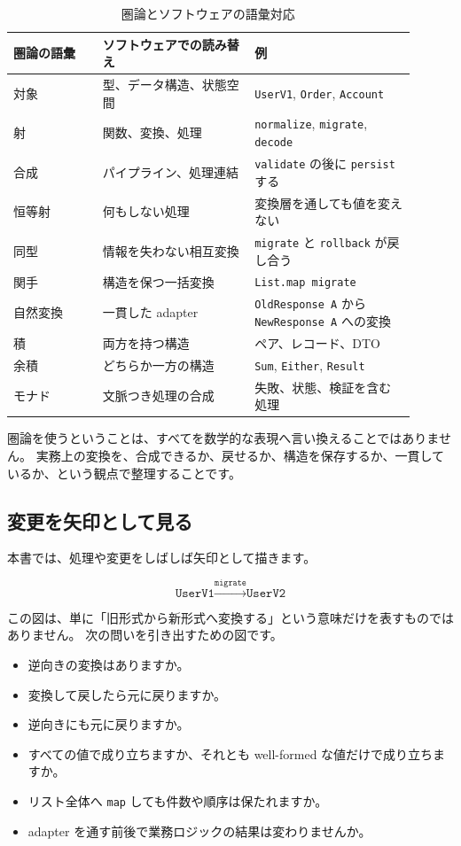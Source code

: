 \begin{table}[htbp]
\centering
\caption{圏論とソフトウェアの語彙対応}
\label{tab:ch00-category-translation}
\begin{tabular}{p{0.20\linewidth}p{0.34\linewidth}p{0.36\linewidth}}
\toprule
圏論の語彙 & ソフトウェアでの読み替え & 例 \\
\midrule
対象 & 型、データ構造、状態空間 & \texttt{UserV1}, \texttt{Order}, \texttt{Account} \\
射 & 関数、変換、処理 & \texttt{normalize}, \texttt{migrate}, \texttt{decode} \\
合成 & パイプライン、処理連結 & \texttt{validate} の後に \texttt{persist} する \\
恒等射 & 何もしない処理 & 変換層を通しても値を変えない \\
同型 & 情報を失わない相互変換 & \texttt{migrate} と \texttt{rollback} が戻し合う \\
関手 & 構造を保つ一括変換 & \texttt{List.map migrate} \\
自然変換 & 一貫した adapter & \texttt{OldResponse A} から \texttt{NewResponse A} への変換 \\
積 & 両方を持つ構造 & ペア、レコード、DTO \\
余積 & どちらか一方の構造 & \texttt{Sum}, \texttt{Either}, \texttt{Result} \\
モナド & 文脈つき処理の合成 & 失敗、状態、検証を含む処理 \\
\bottomrule
\end{tabular}
\end{table}

圏論を使うということは、すべてを数学的な表現へ言い換えることではありません。
実務上の変換を、合成できるか、戻せるか、構造を保存するか、一貫しているか、という観点で整理することです。

\subsection{変更を矢印として見る}

本書では、処理や変更をしばしば矢印として描きます。

\[
  \texttt{UserV1} \xrightarrow{\texttt{migrate}} \texttt{UserV2}
\]

この図は、単に「旧形式から新形式へ変換する」という意味だけを表すものではありません。
次の問いを引き出すための図です。

\begin{itemize}
\item 逆向きの変換はありますか。
\item 変換して戻したら元に戻りますか。
\item 逆向きにも元に戻りますか。
\item すべての値で成り立ちますか、それとも well-formed な値だけで成り立ちますか。
\item リスト全体へ \texttt{map} しても件数や順序は保たれますか。
\item adapter を通す前後で業務ロジックの結果は変わりませんか。
\end{itemize}

